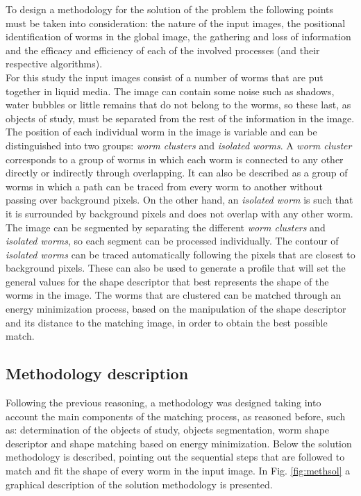 To design a methodology for the solution of the problem the following
points must be taken into consideration: the nature of the input
images, the positional identification of worms in the global image,
the gathering and loss of information and the efficacy and efficiency
of each of the involved processes (and their respective algorithms).\\
For this study the input images consist of a number of worms that
are put together in liquid media. The image can contain some noise such as
shadows, water bubbles or little remains that do not belong to the worms, so
these last, as objects of study, must be separated from the rest of 
the information in the image. The position of each individual
worm in the image is variable and can be distinguished into two 
groups: \emph{worm clusters} and \emph{isolated worms}. A 
\emph{worm cluster} corresponds to a group of worms in which 
each worm is connected to any other directly or indirectly
through overlapping. It can also be described as a group of worms in which a 
path can be traced from every worm to another without passing over 
background pixels. On the other hand, an \emph{isolated worm} is such
that it is surrounded by background pixels and does not overlap
with any other worm. The image can be segmented by separating the different 
\emph{worm clusters} and \emph{isolated worms}, so each segment
can be processed individually. The contour of \emph{isolated worms} can be
traced automatically following the pixels that are closest to background pixels.
These can also be used to generate a profile that will set the general values
for the shape descriptor that best represents the shape of the worms in the image.
The worms that are clustered can be matched through an energy minimization
process, based on the manipulation of the shape descriptor and its distance
to the matching image, in order to obtain the best possible match.

\subsection{Methodology description}
\label{met:description}

Following the previous reasoning, a methodology was designed taking into account
the main components of the matching process, as reasoned before, such as: 
determination of the objects 
of study, objects segmentation, worm shape descriptor and shape matching based on 
energy minimization.
Below the solution methodology is described, pointing out the sequential steps
that are followed to match and fit the shape of every worm in the input image.
In Fig. \ref{fig:methsol} a graphical description of the solution methodology is
presented.\\

